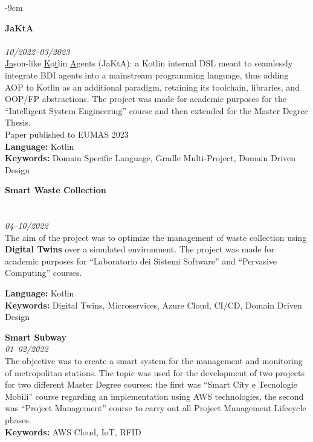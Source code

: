 \documentclass[10pt,a4paper]{altacv}
\begin{document}
\begin{adjustwidth}{}{-9cm}

    \textbf{JaKtA}\\
    \\
    \textit{10/2022--03/2023}\\ \smallskip
    \underline{Ja}son-like \underline{K}o\underline{t}lin \underline{A}gents (JaKtA): a Kotlin internal DSL meant to seamlessly integrate BDI agents into a mainstream programming language, thus adding AOP to Kotlin as an additional paradigm, retaining its toolchain, libraries, and OOP/FP abstractions. The project was made for academic purposes for the ``Intelligent System Engineering'' course and then extended for the Master Degree Thesis.\\ \smallskip
    {\small \notesymbol \hspace{0.5em} Paper published to EUMAS 2023}\\
    \smallskip
    \textbf{Language:} Kotlin\\
    \textbf{Keywords:} Domain Specific Language, Gradle Multi-Project, Domain Driven Design

    \divider


    \textbf{Smart Waste Collection}\\
    \\
    \\
    \textit{04--10/2022}\\ \smallskip
    The aim of the project was to optimize the management of waste collection using \textbf{Digital Twins} over a simulated environment.
    The project was made for academic purposes for ``Laboratorio dei Sistemi Software'' and ``Pervasive Computing'' courses.\\
    \smallskip

    \textbf{Language:} Kotlin\\
    \textbf{Keywords:} Digital Twins, Microservices, Azure Cloud, CI/CD, Domain Driven Design

    \divider

    \textbf{Smart Subway}\\
    \textit{01--02/2022}\\ \smallskip
    The objective was to create a smart system for the management and monitoring of metropolitan stations.
    The topic was used for the development of two projects for two different Master Degree courses: the first was ``Smart City e Tecnologie Mobili'' course regarding an implementation using AWS technologies,
    the second was ``Project Management'' course to carry out all Project Management Lifecycle phases.\\ \smallskip
    \textbf{Keywords:} AWS Cloud, IoT, RFID


\end{adjustwidth}
\end{document}
